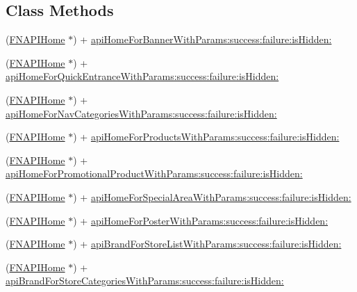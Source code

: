 \subsection*{Class Methods}
\begin{DoxyCompactItemize}
\item 
(\mbox{\hyperlink{interface_f_n_a_p_i_home}{F\+N\+A\+P\+I\+Home}} $\ast$) + \mbox{\hyperlink{interface_f_n_a_p_i_home_a42ecd089ee81ba0fbb0e82bbf076270a}{api\+Home\+For\+Banner\+With\+Params\+:success\+:failure\+:is\+Hidden\+:}}
\item 
(\mbox{\hyperlink{interface_f_n_a_p_i_home}{F\+N\+A\+P\+I\+Home}} $\ast$) + \mbox{\hyperlink{interface_f_n_a_p_i_home_aed96cd7ce4f42f03c6aa4e9a79e82090}{api\+Home\+For\+Quick\+Entrance\+With\+Params\+:success\+:failure\+:is\+Hidden\+:}}
\item 
(\mbox{\hyperlink{interface_f_n_a_p_i_home}{F\+N\+A\+P\+I\+Home}} $\ast$) + \mbox{\hyperlink{interface_f_n_a_p_i_home_a0fa200d5af3a290eeb94493c258c6b82}{api\+Home\+For\+Nav\+Categories\+With\+Params\+:success\+:failure\+:is\+Hidden\+:}}
\item 
(\mbox{\hyperlink{interface_f_n_a_p_i_home}{F\+N\+A\+P\+I\+Home}} $\ast$) + \mbox{\hyperlink{interface_f_n_a_p_i_home_a63bd1e9a7b34578bb3e62bcb7e84bcb7}{api\+Home\+For\+Products\+With\+Params\+:success\+:failure\+:is\+Hidden\+:}}
\item 
(\mbox{\hyperlink{interface_f_n_a_p_i_home}{F\+N\+A\+P\+I\+Home}} $\ast$) + \mbox{\hyperlink{interface_f_n_a_p_i_home_a33c863a18775be71837ac7d84daeb148}{api\+Home\+For\+Promotional\+Product\+With\+Params\+:success\+:failure\+:is\+Hidden\+:}}
\item 
(\mbox{\hyperlink{interface_f_n_a_p_i_home}{F\+N\+A\+P\+I\+Home}} $\ast$) + \mbox{\hyperlink{interface_f_n_a_p_i_home_adcbf4ffb3cb8b24c4ecc5b3e5222a057}{api\+Home\+For\+Special\+Area\+With\+Params\+:success\+:failure\+:is\+Hidden\+:}}
\item 
(\mbox{\hyperlink{interface_f_n_a_p_i_home}{F\+N\+A\+P\+I\+Home}} $\ast$) + \mbox{\hyperlink{interface_f_n_a_p_i_home_aa04fa2e008dc0d2b7d0c262479df874f}{api\+Home\+For\+Poster\+With\+Params\+:success\+:failure\+:is\+Hidden\+:}}
\item 
(\mbox{\hyperlink{interface_f_n_a_p_i_home}{F\+N\+A\+P\+I\+Home}} $\ast$) + \mbox{\hyperlink{interface_f_n_a_p_i_home_a00bd19074dd67e3baaf275a66863f10f}{api\+Brand\+For\+Store\+List\+With\+Params\+:success\+:failure\+:is\+Hidden\+:}}
\item 
(\mbox{\hyperlink{interface_f_n_a_p_i_home}{F\+N\+A\+P\+I\+Home}} $\ast$) + \mbox{\hyperlink{interface_f_n_a_p_i_home_ac866c669ca33d24a794142df09fb9ee2}{api\+Brand\+For\+Store\+Categories\+With\+Params\+:success\+:failure\+:is\+Hidden\+:}}

\end{DoxyCompactItemize}

